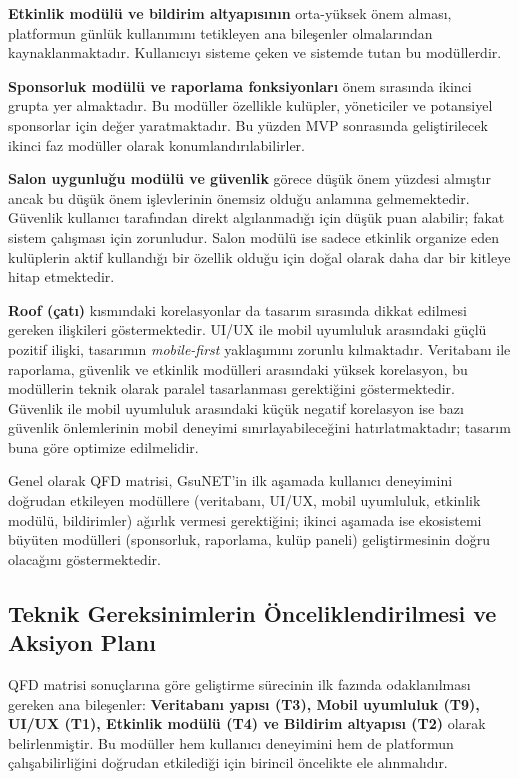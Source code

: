 \documentclass[a4paper,12pt]{report}
\begin{document}
\textbf{Etkinlik modülü ve bildirim altyapısının} orta-yüksek önem alması, platformun günlük kullanımını tetikleyen ana bileşenler olmalarından kaynaklanmaktadır. Kullanıcıyı sisteme çeken ve sistemde tutan bu modüllerdir.

\textbf{Sponsorluk modülü ve raporlama fonksiyonları} önem sırasında ikinci grupta yer almaktadır. Bu modüller özellikle kulüpler, yöneticiler ve potansiyel sponsorlar için değer yaratmaktadır. Bu yüzden MVP sonrasında geliştirilecek ikinci faz modüller olarak konumlandırılabilirler.

\textbf{Salon uygunluğu modülü ve güvenlik} görece düşük önem yüzdesi almıştır ancak bu düşük önem işlevlerinin önemsiz olduğu anlamına gelmemektedir. Güvenlik kullanıcı tarafından direkt algılanmadığı için düşük puan alabilir; fakat sistem çalışması için zorunludur. Salon modülü ise sadece etkinlik organize eden kulüplerin aktif kullandığı bir özellik olduğu için doğal olarak daha dar bir kitleye hitap etmektedir.

\textbf{Roof (çatı)} kısmındaki korelasyonlar da tasarım sırasında dikkat edilmesi gereken ilişkileri göstermektedir. UI/UX ile mobil uyumluluk arasındaki güçlü pozitif ilişki, tasarımın \textit{mobile-first} yaklaşımını zorunlu kılmaktadır. Veritabanı ile raporlama, güvenlik ve etkinlik modülleri arasındaki yüksek korelasyon, bu modüllerin teknik olarak paralel tasarlanması gerektiğini göstermektedir. Güvenlik ile mobil uyumluluk arasındaki küçük negatif korelasyon ise bazı güvenlik önlemlerinin mobil deneyimi sınırlayabileceğini hatırlatmaktadır; tasarım buna göre optimize edilmelidir.

Genel olarak QFD matrisi, GsuNET'in ilk aşamada kullanıcı deneyimini doğrudan etkileyen modüllere (veritabanı, UI/UX, mobil uyumluluk, etkinlik modülü, bildirimler) ağırlık vermesi gerektiğini; ikinci aşamada ise ekosistemi büyüten modülleri (sponsorluk, raporlama, kulüp paneli) geliştirmesinin doğru olacağını göstermektedir.

\subsection{Teknik Gereksinimlerin Önceliklendirilmesi ve Aksiyon Planı}

QFD matrisi sonuçlarına göre geliştirme sürecinin ilk fazında odaklanılması gereken ana bileşenler: \textbf{Veritabanı yapısı (T3), Mobil uyumluluk (T9), UI/UX (T1), Etkinlik modülü (T4) ve Bildirim altyapısı (T2)} olarak belirlenmiştir. Bu modüller hem kullanıcı deneyimini hem de platformun çalışabilirliğini doğrudan etkilediği için birincil öncelikte ele alınmalıdır.
\end{document}
